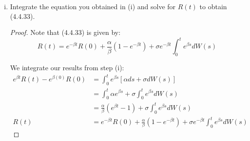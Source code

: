\documentclass{article}
\theoremstyle{definition}
\theoremstyle{definition}
\begin{document}
\begin{enumerate}
\begin{enumerate}[(i)]
        \begin{proof} Recall the It\^{o}-Doeblin formula states:
        $$ df(t,X(t)) = f_t(t,X(t)) dt + f_x(t,X(t)) dX(t) + \frac{1}{2}f_{xx}(t,X(t))dX(t)dX(t)$$
        Hence according to the It\^{o}-Doeblin formula with $f(t,x)=e^{\beta t}x$, the differential of the Vasicek equation is given by
        \begin{align*}
            d\left(e^{\beta t}R(t)\right) &= d f(t,R(t)) \\
            &= \beta e^{\beta t} R(t)dt + e^{\beta t}dR(t) \\
            &= \beta e^{\beta t} R(t)dt + e^{\beta t}\left[(\alpha-\beta R(t)) dt + \sigma dW(t) \right] \\
            &= e^{\beta t}\left[ \beta R(t)dt + \alpha dt-\beta R(t)) dt + \sigma dW(t) \right] \\
            &= e^{\beta t}\left[ \alpha dt + \sigma dW(t) \right] 
        \end{align*}
        \end{proof}
        
        \item Integrate the equation you obtained in (i) and solve for $R(t)$ to obtain (4.4.33).
        
        \begin{proof}
        
        Note that (4.4.33) is given by:
        \begin{equation}
            R(t) = e^{-\beta t}R(0) + \frac{\alpha}{\beta}(1-e^{-\beta t})+ \sigma e^{ -\beta t}\int_0^t e^{\beta s} dW(s) \tag{4.4.33}
        \end{equation}
        
        We integrate our results from step (i):
        \begin{align*}
         e^{\beta t} R(t)-e^{\beta (0)}R(0) &= \int_0^t e^{\beta s}\left[ \alpha ds + \sigma dW(s) \right] \\
         &= \int_0^t \alpha e^{\beta s} + \sigma \int_0^t e^{\beta s} dW(s) \\
         &= \frac{\alpha}{\beta}(e^{\beta t} - 1)+ \sigma \int_0^t e^{\beta s} dW(s) \\
       R(t)  &= e^{-\beta t}R(0)+ \frac{\alpha}{\beta}(1-e^{-\beta t} )+ \sigma e^{-\beta t}\int_0^t e^{\beta s} dW(s)
        \end{align*} \end{proof}
        
    \end{enumerate}
    

\end{enumerate}
\end{document}
